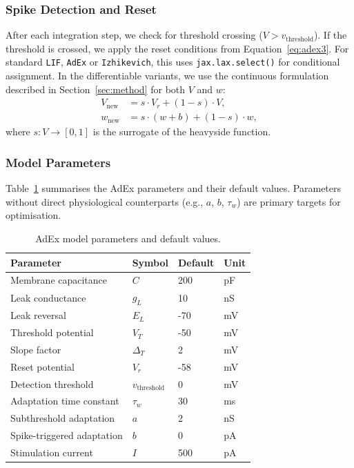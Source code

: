\documentclass[conference]{IEEEtran}
\begin{document}
\subsubsection{Spike Detection and Reset}
After each integration step, we check for threshold crossing ($V > v_{\text{threshold}}$).
If the threshold is crossed, we apply the reset conditions from Equation~\ref{eq:adex3}.
For standard \texttt{LIF}, \texttt{AdEx} or \texttt{Izhikevich}, this uses \texttt{jax.lax.select()} for conditional assignment.
In the differentiable variants, we use the continuous formulation described in Section~\ref{sec:method} for both $V$ and $w$:
\begin{align}
    V_{\text{new}} &= s \cdot V_r + (1 - s) \cdot V, \\
    w_{\text{new}} &= s \cdot (w + b) + (1 - s) \cdot w,
\end{align}
where $s: V\rightarrow [0,1]$ is the surrogate of the heavyside function.

\subsubsection{Model Parameters}
Table~\ref{tab:adex_params} summarises the \ac{AdEx} parameters and their default values.
Parameters without direct physiological counterparts (e.g., $a$, $b$, $\tau_w$) are primary targets for optimisation.

\begin{table}[t]
\centering
\caption{\ac{AdEx} model parameters and default values.}
\label{tab:adex_params}
\begin{tabular}{llll}
\toprule
\textbf{Parameter} & \textbf{Symbol} & \textbf{Default} & \textbf{Unit} \\
\midrule
Membrane capacitance & $C$ & 200 & pF \\
Leak conductance & $g_L$ & 10 & nS \\
Leak reversal & $E_L$ & -70 & mV \\
Threshold potential & $V_T$ & -50 & mV \\
Slope factor & $\Delta_T$ & 2 & mV \\
Reset potential & $V_r$ & -58 & mV \\
Detection threshold & $v_{\text{threshold}}$ & 0 & mV \\
Adaptation time constant & $\tau_w$ & 30 & ms \\
Subthreshold adaptation & $a$ & 2 & nS \\
Spike-triggered adaptation & $b$ & 0 & pA \\
Stimulation current & $I$ & 500 & pA\\
\bottomrule
\end{tabular}
\end{table}
\end{document}
